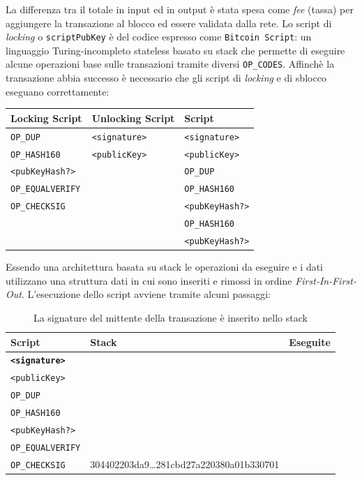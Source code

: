 La differenza tra il totale in input ed in output è stata spesa come \textit{fee} (tassa) per aggiungere la transazione al blocco ed essere validata dalla rete.\newline
Lo script di \textit{locking} o \texttt{scriptPubKey} è del codice espresso come \texttt{Bitcoin~Script}: un linguaggio Turing-incompleto stateless basato su stack che permette di eseguire alcune operazioni base sulle transazioni tramite diversi \texttt{OP\_CODES}.\newline
Affinchè la transazione abbia successo è necessario che gli script di \textit{locking} e di sblocco eseguano correttamente:
\begin{table}[H]
    \centering
    \begin{tabular}{l|l|l}
        Locking Script & Unlocking Script & Script\\
        \hline
        \texttt{OP\_DUP}         & \texttt{<signature>} & \texttt{<signature>}\\
        \texttt{OP\_HASH160}     & \texttt{<publicKey>} & \texttt{<publicKey>}\\
        \texttt{<pubKeyHash?>}   &                      & \texttt{OP\_DUP}\\
        \texttt{OP\_EQUALVERIFY} &                      & \texttt{OP\_HASH160}\\
        \texttt{OP\_CHECKSIG}    &                      & \texttt{<pubKeyHash?>}\\
                                 &                      & \texttt{OP\_HASH160}\\
                                 &                      & \texttt{<pubKeyHash?>}\\
    \end{tabular}
\end{table}
Essendo una architettura basata su stack le operazioni da eseguire e i dati utilizzano una struttura dati in cui sono inseriti e rimossi in ordine \textit{First-In-First-Out}.\newline
L'esecuzione dello script avviene tramite alcuni passaggi:
\begin{table}[H]
    \centering
    \begin{tabular}{p{3cm}|p{7.7cm}|p{3cm}}
        Script & Stack & Eseguite\\
        \hline
        \texttt{\textbf{<signature>}} & &\\
        \texttt{<publicKey>}          & &\\
        \texttt{OP\_DUP}              & &\\
        \texttt{OP\_HASH160}          & &\\
        \texttt{<pubKeyHash?>}        & &\\
        \texttt{OP\_EQUALVERIFY}      & &\\
        \texttt{OP\_CHECKSIG}         & 304402203da9\dots281cbd27a220380a01b330701 & \\
    \end{tabular}
    \caption{La signature del mittente della transazione è inserito nello stack}
\end{table}

